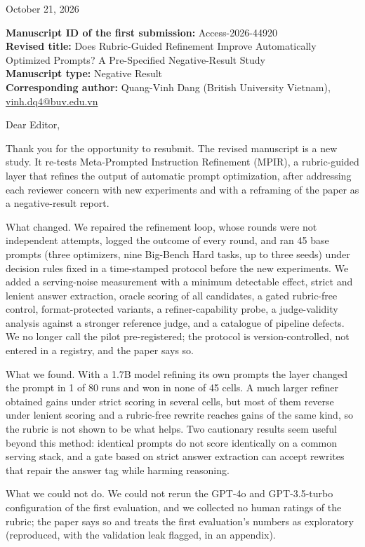 \documentclass[11pt]{article}
\begin{document}
\begin{flushright}
October 21, 2026
\end{flushright}

\textbf{Manuscript ID of the first submission:} Access-2026-44920\\
\textbf{Revised title:} Does Rubric-Guided Refinement Improve Automatically Optimized Prompts? A
Pre-Specified Negative-Result Study\\
\textbf{Manuscript type:} Negative Result\\
\textbf{Corresponding author:} Quang-Vinh Dang (British University Vietnam), \url{vinh.dq4@buv.edu.vn}

\bigskip
Dear Editor,

\bigskip
Thank you for the opportunity to resubmit. The revised manuscript is a new study. It re-tests
Meta-Prompted Instruction Refinement (MPIR), a rubric-guided layer that refines the output of automatic prompt
optimization, after addressing each reviewer concern with new experiments and with a reframing of the paper
as a negative-result report.

\bigskip
What changed. We repaired the refinement loop, whose rounds were not independent attempts, logged the outcome
of every round, and ran 45 base prompts (three optimizers, nine Big-Bench Hard tasks, up to three seeds) under
decision rules fixed in a time-stamped protocol before the new experiments. We added a serving-noise
measurement with a minimum detectable effect, strict and lenient answer extraction, oracle scoring of all
candidates, a gated rubric-free control, format-protected variants, a refiner-capability probe, a
judge-validity analysis against a stronger reference judge, and a catalogue of pipeline defects. We no longer
call the pilot pre-registered; the protocol is version-controlled, not entered in a registry, and the paper
says so.

\bigskip
What we found. With a 1.7B model refining its own prompts the layer changed the prompt in 1 of 80 runs and won
in none of 45 cells. A much larger refiner obtained gains under strict scoring in several cells, but most of
them reverse under lenient scoring and a rubric-free rewrite reaches gains of the same kind, so the rubric is
not shown to be what helps. Two cautionary results seem useful beyond this method: identical prompts do not
score identically on a common serving stack, and a gate based on strict answer extraction can accept rewrites
that repair the answer tag while harming reasoning.

\bigskip
What we could not do. We could not rerun the GPT-4o and GPT-3.5-turbo configuration of the first evaluation,
and we collected no human ratings of the rubric; the paper says so and treats the first evaluation's numbers
as exploratory (reproduced, with the validation leak flagged, in an appendix).
\end{document}
